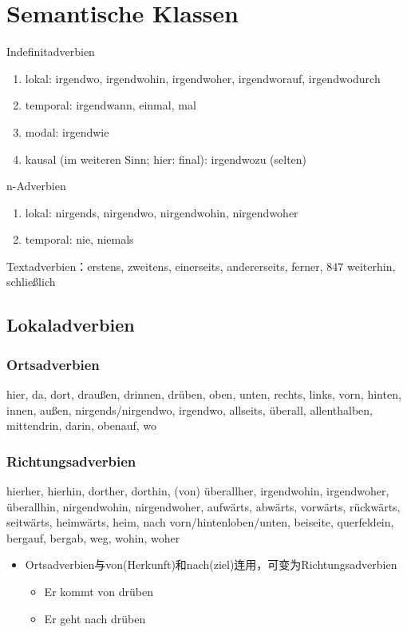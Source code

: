 \documentclass[UTF8]{report}
\begin{document}
\section{Semantische Klassen}
Indefinitadverbien
\begin{enumerate}
    \item lokal: irgendwo, irgendwohin, irgendwoher, irgendworauf, irgendwodurch
    \item temporal: irgendwann, einmal, mal
    \item modal: irgendwie
    \item kausal (im weiteren Sinn; hier: final): irgendwozu (selten)
\end{enumerate}
n-Adverbien
\begin{enumerate}
    \item lokal: nirgends, nirgendwo, nirgendwohin, nirgendwoher
    \item temporal: nie, niemals
\end{enumerate}

Textadverbien：erstens, zweitens, einerseits, andererseits, ferner, 847 weiterhin, schließlich

\subsection{Lokaladverbien}
\subsubsection{Ortsadverbien}
hier, da, dort, draußen, drinnen, drüben, oben, unten, rechts, links, vorn, hinten, innen, außen, nirgends/nirgendwo, irgendwo, allseits, überall, allenthalben, mittendrin, darin, obenauf, wo

\subsubsection{Richtungsadverbien}
hierher, hierhin, dorther, dorthin, (von) überallher, irgendwohin, irgendwoher, überallhin, nirgendwohin, nirgendwoher, aufwärts, abwärts, vorwärts, rückwärts, seitwärts, heimwärts, heim, nach vorn/hintenloben/unten, beiseite, querfeldein, bergauf, bergab, weg, wohin, woher

\begin{itemize}
    \item Ortsadverbien与von(Herkunft)和nach(ziel)连用，可变为Richtungsadverbien
    \begin{itemize}
        \item Er kommt von drüben
        \item Er geht nach drüben
    \end{itemize}
\end{itemize}
\end{document}
